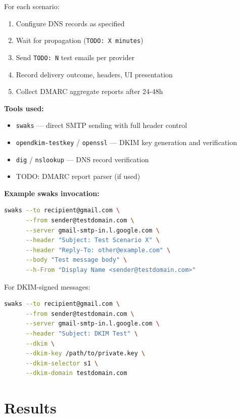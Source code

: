 \documentclass[11pt,a4paper]{article}
\begin{document}
For each scenario:
\begin{enumerate}[noitemsep]
    \item Configure DNS records as specified
    \item Wait for propagation (\texttt{TODO: X minutes})
    \item Send \texttt{TODO: N} test emails per provider
    \item Record delivery outcome, headers, UI presentation
    \item Collect DMARC aggregate reports after 24-48h
\end{enumerate}

\noindent\textbf{Tools used:}
\begin{itemize}[noitemsep]
    \item \texttt{swaks} — direct SMTP sending with full header control
    \item \texttt{opendkim-testkey} / \texttt{openssl} — DKIM key generation and verification
    \item \texttt{dig} / \texttt{nslookup} — DNS record verification
    \item TODO: DMARC report parser (if used)
\end{itemize}

\noindent\textbf{Example swaks invocation:}
\begin{lstlisting}[language=bash]
swaks --to recipient@gmail.com \
      --from sender@testdomain.com \
      --server gmail-smtp-in.l.google.com \
      --header "Subject: Test Scenario X" \
      --header "Reply-To: other@example.com" \
      --body "Test message body" \
      --h-From "Display Name <sender@testdomain.com>"
\end{lstlisting}

For DKIM-signed messages:
\begin{lstlisting}[language=bash]
swaks --to recipient@gmail.com \
      --from sender@testdomain.com \
      --server gmail-smtp-in.l.google.com \
      --header "Subject: DKIM Test" \
      --dkim \
      --dkim-key /path/to/private.key \
      --dkim-selector s1 \
      --dkim-domain testdomain.com
\end{lstlisting}

\section{Results}
\end{document}
